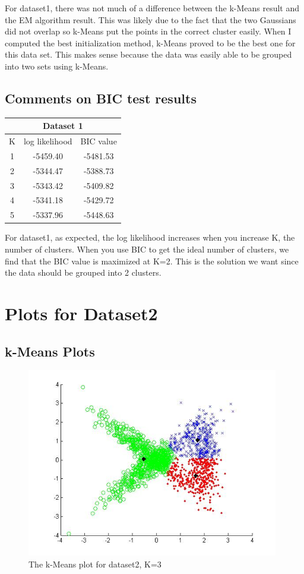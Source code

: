 \documentclass[11pt,psfig]{article}
\begin{document}
For dataset1, there was not much of a difference between the k-Means result and the EM algorithm result. This was likely due to the fact that the two Gaussians did not overlap so k-Means put the points in the correct cluster easily. When I computed the best initialization method, k-Means proved to be the best one for this data set. This makes sense because the data was easily able to be grouped into two sets using k-Means. 

\subsection{Comments on BIC test results}

\begin{table}[H]
  \centering
  \begin{tabular}{|c|c|c|}
    \hline
    \multicolumn{3}{|c|}{Dataset 1} \\\hline
    K & log likelihood & BIC value \\\hline
    1 & -5459.40 & -5481.53 \\
		2 & -5344.47 & -5388.73 \\
		3 & -5343.42 & -5409.82 \\
		4 & -5341.18 & -5429.72 \\
    5 & -5337.96 & -5448.63 \\\hline
  \end{tabular}
\end{table}

For dataset1, as expected, the log likelihood increases when you increase K, the number of clusters. When you use BIC to get the ideal number of clusters, we find that the BIC value is maximized at K=2. This is the solution we want since the data should be grouped into 2 clusters. 

\section{Plots for Dataset2}

\subsection{k-Means Plots}

\begin{figure}[H]
\centering
\includegraphics[height=3.25in]{dataset2_kMeansPlot.jpg}
\caption{The k-Means plot for dataset2, K=3}
\end{figure}
\end{document}
